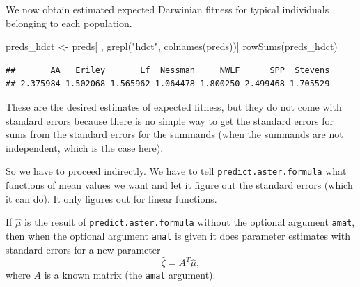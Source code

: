 \documentclass[
  ignorenonframetext,
]{beamer}
\newenvironment{Shaded}{\begin{snugshade}}{\end{snugshade}}
\newcommand{\FunctionTok}[1]{\textcolor[rgb]{0.00,0.00,0.00}{#1}}
\newcommand{\NormalTok}[1]{#1}
\newcommand{\OtherTok}[1]{\textcolor[rgb]{0.56,0.35,0.01}{#1}}
\newcommand{\StringTok}[1]{\textcolor[rgb]{0.31,0.60,0.02}{#1}}
\begin{document}
\begin{frame}[fragile]{}
\protect\hypertarget{section-35}{}
We now obtain estimated expected Darwinian fitness for typical
individuals belonging to each population.

\vspace{12pt}
\tiny

\begin{Shaded}
\begin{Highlighting}[]
\NormalTok{preds\_hdct }\OtherTok{\textless{}{-}}\NormalTok{ preds[ , }\FunctionTok{grepl}\NormalTok{(}\StringTok{"hdct"}\NormalTok{, }\FunctionTok{colnames}\NormalTok{(preds))]}
\FunctionTok{rowSums}\NormalTok{(preds\_hdct)}
\end{Highlighting}
\end{Shaded}

\begin{verbatim}
##       AA   Eriley       Lf  Nessman     NWLF      SPP  Stevens 
## 2.375984 1.502068 1.565962 1.064478 1.800250 2.499468 1.705529
\end{verbatim}
\end{frame}

\begin{frame}{}
\protect\hypertarget{section-36}{}
These are the desired estimates of expected fitness, but they do not
come with standard errors because there is no simple way to get the
standard errors for sums from the standard errors for the summands (when
the summands are not independent, which is the case here).

So we have to proceed indirectly. We have to tell
\texttt{predict.aster.formula} what functions of mean values we want and
let it figure out the standard errors (which it can do). It only figures
out for linear functions.

If \(\hat\mu\) is the result of \texttt{predict.aster.formula} without
the optional argument \texttt{amat}, then when the optional argument
\texttt{amat} is given it does parameter estimates with standard errors
for a new parameter \[
  \hat\zeta = A^T\hat\mu,
\] where \(A\) is a known matrix (the \texttt{amat} argument).
\end{frame}
\end{document}
